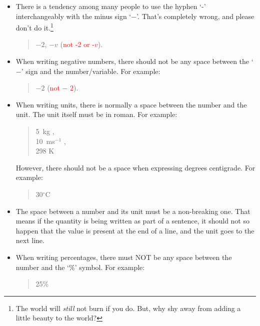 \begin{itemize}
\item There is a tendency among many people to use the hyphen `-' interchangeably with the minus sign `$-$'. That's completely wrong, and please don't do it.\footnote{The world will {\em still} not burn if you do. But, why shy away from adding a little beauty to the world?}
\begin{quote}
$-2$, $-v$ \quad (\textcolor{red}{not -2 or -$v$}). 
\end{quote}


\item When writing negative numbers, there should not be any space between the `$-$' sign and the number/variable. For example:
\begin{quote}
$-2$ \quad (\textcolor{red}{not $-$ $2$}). 
\end{quote}


\item When writing units, there is normally a space between the number and the unit. The unit itself must be in roman. For example:
\begin{quote}
5~kg \quad {}, \\
10~ms$^{-1}$ \quad {}, \\
298 K \quad {}
\end{quote}
However, there should not be a space when expressing degrees centigrade. For example:
\begin{quote}
30$^\circ$C \quad {}
\end{quote}

\item The space between a number and its unit must be a non-breaking one. That means if the quantity is being written as part of a sentence, it should not so happen that the value is present at the end of a line, and the unit goes to the next line. 

\item When writing percentages, there must NOT be any space between the number and the `\%' symbol. For example:
\begin{quote}
25\% \quad {}
\end{quote}


\end{itemize}

